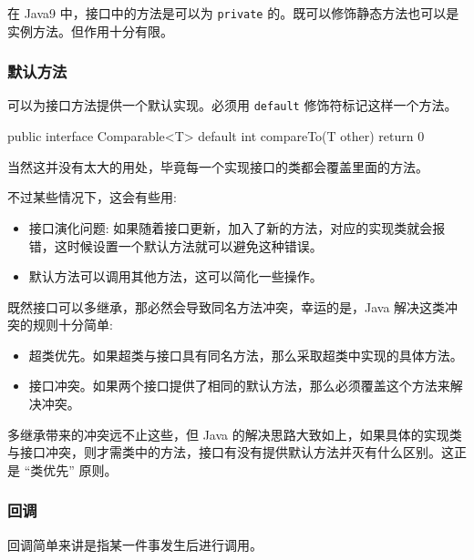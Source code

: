 在 Java9 中，接口中的方法是可以为 \texttt{private} 的。既可以修饰静态方法也可以是实例方法。但作用十分有限。

\subsubsection{默认方法}

可以为接口方法提供一个默认实现。必须用 \texttt{default} 修饰符标记这样一个方法。

\begin{Java}
public interface Comparable<T> {
    default int compareTo(T other) {
        return 0
    }
}
\end{Java}

当然这并没有太大的用处，毕竟每一个实现接口的类都会覆盖里面的方法。

不过某些情况下，这会有些用:
\begin{itemize}
    \item 接口演化问题: 如果随着接口更新，加入了新的方法，对应的实现类就会报错，这时候设置一个默认方法就可以避免这种错误。
    \item 默认方法可以调用其他方法，这可以简化一些操作。
\end{itemize}

既然接口可以多继承，那必然会导致同名方法冲突，幸运的是，Java 解决这类冲突的规则十分简单:
\begin{itemize}
    \item 超类优先。如果超类与接口具有同名方法，那么采取超类中实现的具体方法。
    \item 接口冲突。如果两个接口提供了相同的默认方法，那么必须覆盖这个方法来解决冲突。
\end{itemize}

多继承带来的冲突远不止这些，但 Java 的解决思路大致如上，如果具体的实现类与接口冲突，则才需类中的方法，接口有没有提供默认方法并灭有什么区别。这正是 ``类优先'' 原则。

\subsubsection{回调}

回调简单来讲是指某一件事发生后进行调用。